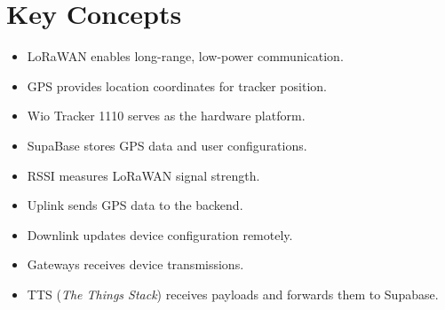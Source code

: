 \section{Key Concepts}
\begin{itemize}
    \item \gls{LoRaWAN} enables long-range, low-power communication.
    \item \gls{GPS} provides location coordinates for tracker position.
    \item \gls{Wio Tracker 1110} serves as the hardware platform.
    \item \gls{SupaBase} stores GPS data and user configurations.
    \item \gls{RSSI} measures LoRaWAN signal strength.
    \item \gls{Uplink} sends GPS data to the backend.
    \item \gls{Downlink} updates device configuration remotely.
    \item \gls{Gateways} receives device transmissions.
    \item \gls{TTS} (\textit{The Things Stack}) receives payloads and forwards them to Supabase.
\end{itemize}

\clearpage

